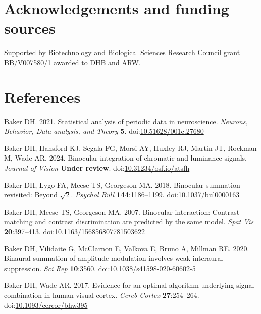 \documentclass[
]{article}
\newlength{\cslhangindent}
\newlength{\cslentryspacingunit} %
\newenvironment{CSLReferences}[2] %
 {%
  \setlength{\parindent}{0pt}
  \ifodd #1
  \let\oldpar\par
  \def\par{\hangindent=\cslhangindent\oldpar}
  \fi
  \setlength{\parskip}{#2\cslentryspacingunit}
 }%
 {}
\begin{document}
\hypertarget{acknowledgements-and-funding-sources}{%
\section{Acknowledgements and funding sources}\label{acknowledgements-and-funding-sources}}

Supported by Biotechnology and Biological Sciences Research Council grant BB/V007580/1 awarded to DHB and ARW.

\hypertarget{references}{%
\section{References}\label{references}}

\hypertarget{refs}{}
\begin{CSLReferences}{1}{0}
\leavevmode{}%
Baker DH. 2021. Statistical analysis of periodic data in neuroscience. \emph{Neurons, Behavior, Data analysis, and Theory} \textbf{5}. doi:\href{https://doi.org/10.51628/001c.27680}{10.51628/001c.27680}

\leavevmode{}%
Baker DH, Hansford KJ, Segala FG, Morsi AY, Huxley RJ, Martin JT, Rockman M, Wade AR. 2024. Binocular integration of chromatic and luminance signals. \emph{Journal of Vision} \textbf{Under review}. doi:\href{https://doi.org/10.31234/osf.io/atsfh}{10.31234/osf.io/atsfh}

\leavevmode{}%
Baker DH, Lygo FA, Meese TS, Georgeson MA. 2018. Binocular summation revisited: Beyond \(\sqrt{2}\). \emph{Psychol Bull} \textbf{144}:1186--1199. doi:\href{https://doi.org/10.1037/bul0000163}{10.1037/bul0000163}

\leavevmode{}%
Baker DH, Meese TS, Georgeson MA. 2007. Binocular interaction: Contrast matching and contrast discrimination are predicted by the same model. \emph{Spat Vis} \textbf{20}:397--413. doi:\href{https://doi.org/10.1163/156856807781503622}{10.1163/156856807781503622}

\leavevmode{}%
Baker DH, Vilidaite G, McClarnon E, Valkova E, Bruno A, Millman RE. 2020. Binaural summation of amplitude modulation involves weak interaural suppression. \emph{Sci Rep} \textbf{10}:3560. doi:\href{https://doi.org/10.1038/s41598-020-60602-5}{10.1038/s41598-020-60602-5}

\leavevmode{}%
Baker DH, Wade AR. 2017. Evidence for an optimal algorithm underlying signal combination in human visual cortex. \emph{Cereb Cortex} \textbf{27}:254--264. doi:\href{https://doi.org/10.1093/cercor/bhw395}{10.1093/cercor/bhw395}


\end{CSLReferences}
\end{document}
